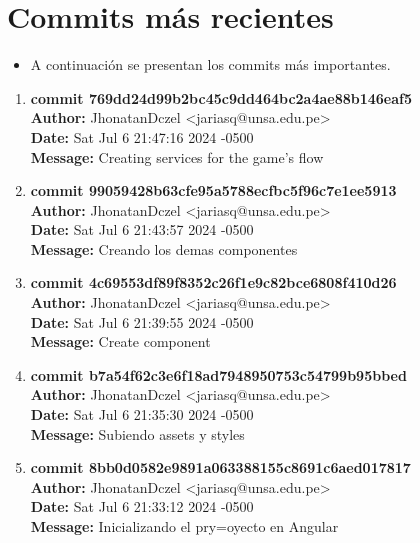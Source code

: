 \section{Commits más recientes}
\begin{itemize}
    \item A continuación se presentan los commits más importantes.
\end{itemize}


\begin{enumerate}
    \item \textbf{commit 769dd24d99b2bc45c9dd464bc2a4ae88b146eaf5} \\
    \textbf{Author:} JhonatanDczel <jariasq@unsa.edu.pe> \\
    \textbf{Date:} Sat Jul 6 21:47:16 2024 -0500 \\
    \textbf{Message:} Creating services for the game's flow

    \item \textbf{commit 99059428b63cfe95a5788ecfbc5f96c7e1ee5913} \\
    \textbf{Author:} JhonatanDczel <jariasq@unsa.edu.pe> \\
    \textbf{Date:} Sat Jul 6 21:43:57 2024 -0500 \\
    \textbf{Message:} Creando los demas componentes

    \item \textbf{commit 4c69553df89f8352c26f1e9c82bce6808f410d26} \\
    \textbf{Author:} JhonatanDczel <jariasq@unsa.edu.pe> \\
    \textbf{Date:} Sat Jul 6 21:39:55 2024 -0500 \\
    \textbf{Message:} Create component

    \item \textbf{commit b7a54f62c3e6f18ad7948950753c54799b95bbed} \\
    \textbf{Author:} JhonatanDczel <jariasq@unsa.edu.pe> \\
    \textbf{Date:} Sat Jul 6 21:35:30 2024 -0500 \\
    \textbf{Message:} Subiendo assets y styles

    \item \textbf{commit 8bb0d0582e9891a063388155c8691c6aed017817} \\
    \textbf{Author:} JhonatanDczel <jariasq@unsa.edu.pe> \\
    \textbf{Date:} Sat Jul 6 21:33:12 2024 -0500 \\
    \textbf{Message:} Inicializando el pry=oyecto en Angular


\end{enumerate}
